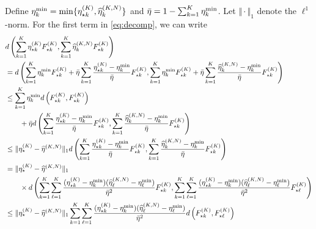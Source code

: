 Define $\eta_k^{\min} = \min\{\eta^{(K)}_{\star k}, \widehat{\eta}^{(K, N)}_k\}$ and $\bar{\eta}=1-\sum_{k=1}^{K}\eta_k^{\min}$.
Let $\Vert \cdot \Vert_{1}$ denote the $\ell^1$-norm.
For the first term in \cref{eq:decomp}, we can write
\begin{align}
	 & d\left(\sum_{k = 1}^{\numcomps} \eta^{(\numcomps)}_{\star k}F^{(\numcomps)}_{\star k}, \sum_{k = 1}^{\numcomps}  \widehat{\eta}_k^{(\numcomps, \numobs)} F^{(\numcomps)}_{\star k} \right)\\
	 & = d\left(\sum_{k = 1}^{\numcomps} \eta_k^{\min}F^{(\numcomps)}_{\star k} + \bar{\eta}\sum_{k = 1}^{\numcomps}  \frac{\eta^{(\numcomps)}_{\star k}-\eta_k^{\min}}{\bar{\eta}}F^{(\numcomps)}_{\star k}, \sum_{k = 1}^{\numcomps}  \eta_k^{\min}F^{(\numcomps)}_{\star k}+ \bar{\eta}\sum_{k = 1}^{\numcomps}  \frac{\widehat{\eta}_k^{(\numcomps, \numobs)} -  \eta_k^{\min}}{\bar{\eta}}F^{(\numcomps)}_{\star k} \right)  \\
	 & \le \sum_{k = 1}^{\numcomps} \eta_k^{\min}d\left(F^{(\numcomps)}_{\star k}, F^{(\numcomps)}_{\star k}\right) \\
   &\qquad+ \bar{\eta}d\left(\sum_{k = 1}^{\numcomps}  \frac{\eta^{(\numcomps)}_{\star k}-\eta_k^{\min}}{\bar{\eta}}F^{(\numcomps)}_{\star k}, \sum_{k = 1}^{\numcomps}  \frac{\widehat{\eta}_k^{(\numcomps, \numobs)} -  \eta_k^{\min}}{\bar{\eta}}F^{(\numcomps)}_{\star k}\right)\label{eq:joint-convexity}\\
	 & \le \Vert \eta^{(\numcomps)}_{\star} - \widehat{\eta}^{(\numcomps,\numobs)} \Vert_{1} d\left(\sum_{k = 1}^{\numcomps}  \frac{\eta^{(\numcomps)}_{\star k}-\eta_k^{\min}}{\bar{\eta}}F^{(\numcomps)}_{\star k}, \sum_{k = 1}^{\numcomps}  \frac{\widehat{\eta}_k^{(\numcomps, \numobs)} -  \eta_k^{\min}}{\bar{\eta}}F^{(\numcomps)}_{\star k}\right)\label{eq:pi-l1norm-bound-pibar} \\
	 & = \Vert \eta^{(\numcomps)}_{\star} - \widehat{\eta}^{(\numcomps,\numobs)}\Vert_{1} \\
	 & \qquad \times  d\left( \sum_{k = 1}^{\numcomps} \sum_{\ell = 1}^{\numcomps} \frac{(\eta^{(\numcomps)}_{\star k}-\eta_k^{\min})(\widehat{\eta}_\ell^{(\numcomps, \numobs)} -  \eta_\ell^{\min}) }{\bar{\eta}^2}  F^{(\numcomps)}_{\star k}, \sum_{k = 1}^{\numcomps} \sum_{\ell = 1}^{\numcomps} \frac{(\eta^{(\numcomps)}_{\star k}-\eta_k^{\min})(\widehat{\eta}_\ell^{(\numcomps, \numobs)} -  \eta_\ell^{\min}) }{\bar{\eta}^2} F^{(\numcomps)}_{\star \ell}\right) \\
	 & \le \Vert \eta^{(\numcomps)}_{\star} - \widehat{\eta}^{(\numcomps,\numobs)}\Vert_{1} \sum_{k = 1}^{\numcomps} \sum_{\ell = 1}^{\numcomps} \frac{(\eta^{(\numcomps)}_{\star k}-\eta_k^{\min})(\widehat{\eta}_\ell^{(\numcomps, \numobs)} -  \eta_\ell^{\min}) }{\bar{\eta}^2} d\left(F^{(\numcomps)}_{\star k}, F^{(\numcomps)}_{\star \ell}\right)\\

\end{align}
